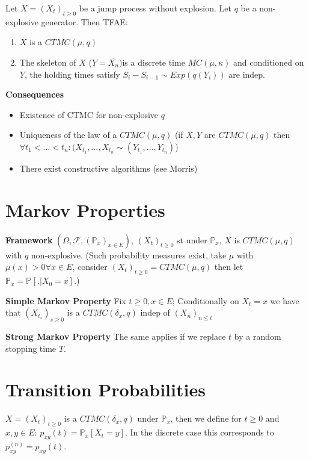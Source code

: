\begin{theorem}
Let $X=(X_t)_{t\geq 0}$ be a jump process without explosion. Let $q$ be a non-explosive generator. Then TFAE:
\begin{enumerate}
	\item $X$ is a $CTMC(\mu, q)$
	\item The skeleton of $X$ ($Y= \overline{X_n})$is a discrete time $MC(\mu, \kappa ) $ and conditioned on $Y$, the holding times satisfy $S_i-S_{i-1} \sim Exp(q(Y_i))$ are indep. 
\end{enumerate}

\end{theorem}
\textbf{Consequences} 
\begin{itemize}
	\item Existence of CTMC	 for non-explosive $q$ 
	\item Uniqueness of the law of a $CTMC(\mu, q)$ (if $X, Y$ are $CTMC(\mu,q )$ then $\forall t_1<...<t_n: (X_{t_1},...,X_{t_n} \sim (Y_{t_1},..., Y_{t_n})$)
	\item There exist constructive algorithms (see Morris)
\end{itemize}

\section{Markov Properties}
\noindent
\textbf{Framework} $(\Omega, \mathcal{F}, (\mathbb{P}_{x})_{x \in E}) $, $(X_t)_{t\geq 0}$ st under $\mathbb{P}_{x}$, $X$ is  $CTMC(\mu, q)$ with $q$ non-explosive. (Such probability measures exist, take $\mu $ with $\mu (x)> 0 \forall x \in E$, consider $(X_t)_{t\geq 0}=CTMC(\mu,q)$ then let $\mathbb{P}_{x} = \mathbb{P}_{} \left[ . | X_0 =x \right]  $.)

\textbf{Simple Markov Property} Fix $t\geq 0, x \in E$; Conditionally on $X_t =x$ we have that $(X_{t_s})_{s \geq 0}$ is a $CTMC(\delta_x, q)$ indep of $(X_n)_{n \leq t}$

\textbf{Strong Markov Property}
The same applies if we replace $t$ by a random stopping time $T$.

\section{Transition Probabilities}
$X=(X_t)_{t\geq 0}$ is a $CTMC(\delta_x, q)$ under $\mathbb{P}_{x} $, then we define for $t\geq 0$ and $x,y \in E$: $p_{xy}(t)= \mathbb{P}_{x} \left[ X_t =y \right] $. In the discrete case this corresponds to $p_{xy}^{(n)}= p_{xy}(t)$.

